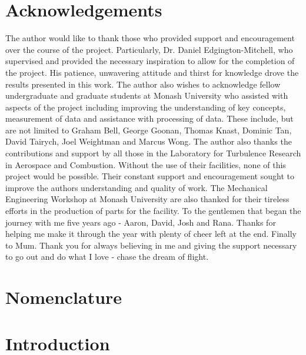 \newpage
\section*{Acknowledgements}
The author would like to thank those who provided support and encouragement over the course of the project. Particularly, Dr. Daniel Edgington-Mitchell, who supervised and provided the necessary inspiration to allow for the completion of the project. His patience, unwavering attitude and thirst for knowledge drove the results presented in this work. The author also wishes to acknowledge fellow undergraduate and graduate students at Monash University who assisted with aspects of the project including improving the understanding of key concepts, measurement of data and assistance with processing of data. These include, but are not limited to Graham Bell, George Goonan, Thomas Knast, Dominic Tan, David Tairych, Joel Weightman and Marcus Wong. The author also thanks the contributions and support by all those in the Laboratory for Turbulence Research in
Aerospace and Combustion. Without the use of their facilities, none of this project would
be possible. Their constant support and encouragement sought to improve the authors
understanding and quality of work.
The Mechanical Engineering Workshop at Monash University are also thanked for their
tireless efforts in the production of parts for the facility.
To the gentlemen that began the journey with me five years ago - Aaron, David, Josh and
Rana. Thanks for helping me make it through the year with plenty of cheer left at the end.
Finally to Mum. Thank you for always believing in me and giving the support necessary
to go out and do what I love - chase the dream of flight.
\newpage
\tableofcontents
\newpage
\listoftables
\newpage
\listoffigures
\newpage
\section*{Nomenclature}


\newpage
{}
\section{Introduction} 

